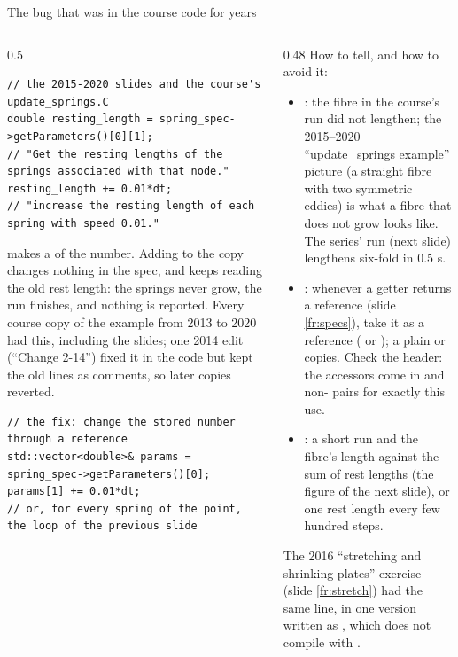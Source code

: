 \documentclass[aspectratio=169,11pt]{beamer}
\begin{document}
\begin{frame}[fragile]{The bug that was in the course code for years}
\label{fr:copybug}
\begin{columns}[T,onlytextwidth]
\begin{column}{0.5\textwidth}
\begin{lstlisting}[style=cpptiny]
// the 2015-2020 slides and the course's update_springs.C
double resting_length = spring_spec->getParameters()[0][1];
// "Get the resting lengths of the springs associated with that node."
resting_length += 0.01*dt;
// "increase the resting length of each spring with speed 0.01."
\end{lstlisting}
\footnotesize {} makes a  of the number. Adding to the copy changes nothing in the spec, and  keeps reading the old rest length: the springs never grow, the run finishes, and nothing is reported. Every course copy of the example from 2013 to 2020 had this, including the slides; one 2014 edit (``Change 2-14'') fixed it in the code but kept the old lines as comments, so later copies reverted.
\begin{lstlisting}[style=cpptiny]
// the fix: change the stored number through a reference
std::vector<double>& params = spring_spec->getParameters()[0];
params[1] += 0.01*dt;
// or, for every spring of the point, the loop of the previous slide
\end{lstlisting}
\end{column}
\begin{column}{0.48\textwidth}
\scriptsize How to tell, and how to avoid it:
\begin{itemize}
  \item {}: the fibre in the course's run did not lengthen; the 2015--2020 ``update\_springs example'' picture (a straight fibre with two symmetric eddies) is what a fibre that does not grow looks like. The series' run (next slide) lengthens six-fold in 0.5 s.
  \item {}: whenever a getter returns a reference (slide \ref{fr:specs}), take it as a reference ( or ); a plain  or  copies. Check the header: the accessors come in  and non- pairs for exactly this use.
  \item {}: a short run and the fibre's length against the sum of rest lengths (the figure of the next slide), or  one rest length every few hundred steps.
\end{itemize}
\scriptsize The 2016 ``stretching and shrinking plates'' exercise (slide \ref{fr:stretch}) had the same line, in one version written as , which does not compile with .
\end{column}
\end{columns}
\end{frame}
\end{document}
